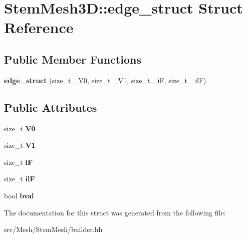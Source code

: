 \hypertarget{structStemMesh3D_1_1edge__struct}{}\section{Stem\+Mesh3D\+:\+:edge\+\_\+struct Struct Reference}
\label{structStemMesh3D_1_1edge__struct}
\subsection*{Public Member Functions}
\begin{DoxyCompactItemize}
\item 
\mbox{\label{structStemMesh3D_1_1edge__struct_a72f6a67fcca5f9773b3c51629297451f}} 
{\bfseries edge\+\_\+struct} (size\+\_\+t \+\_\+\+V0, size\+\_\+t \+\_\+\+V1, size\+\_\+t \+\_\+iF, size\+\_\+t \+\_\+ilF)
\end{DoxyCompactItemize}
\subsection*{Public Attributes}
\begin{DoxyCompactItemize}
\item 
\mbox{\label{structStemMesh3D_1_1edge__struct_ae8eeed6a7553815472116d2a7b7a6699}} 
size\+\_\+t {\bfseries V0}
\item 
\mbox{\label{structStemMesh3D_1_1edge__struct_a753424fef6b438026e10d86ceb39b4f9}} 
size\+\_\+t {\bfseries V1}
\item 
\mbox{\label{structStemMesh3D_1_1edge__struct_a20680666adeadc5ab4632469084efe06}} 
size\+\_\+t {\bfseries iF}
\item 
\mbox{\label{structStemMesh3D_1_1edge__struct_a51c6031bf4c5705d4d83787a15dd897c}} 
size\+\_\+t {\bfseries ilF}
\item 
\mbox{\label{structStemMesh3D_1_1edge__struct_ad9e56beb0f51457b362cef4841185dde}} 
bool {\bfseries bval}
\end{DoxyCompactItemize}


The documentation for this struct was generated from the following file\+:\begin{DoxyCompactItemize}
\item 
src/\+Mesh/\+Stem\+Mesh/builder.\+hh\end{DoxyCompactItemize}
